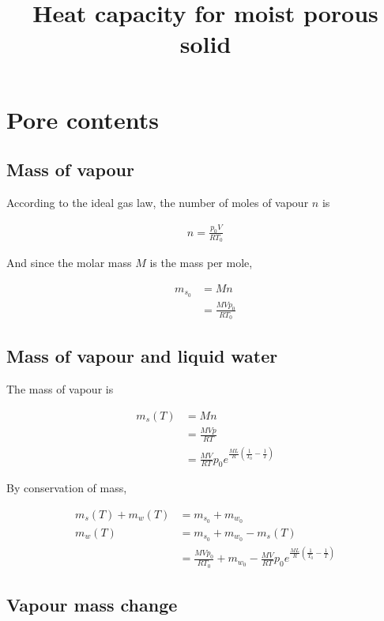 \documentclass{article}
\title{Heat capacity for moist porous solid}
\date{}
\begin{document}
\maketitle

\section{Pore contents}

\subsection{Mass of vapour}

According to the ideal gas law, the number of moles of vapour $n$ is

\begin{align*}
n = \frac{p_0 V}{RT_0}
\end{align*}

And since the molar mass $M$ is the mass per mole,

\begin{align*}
m_{s_0} &= Mn \\
&= \frac{MVp_0}{RT_0}
\end{align*}

\subsection{Mass of vapour and liquid water}

The mass of vapour is

\begin{align*}
m_s(T) &= Mn \\
&= \frac{MVp}{RT} \\
&= \frac{MV}{RT}p_0 e^{\frac{ML}{R}\left(\frac{1}{T_0} - \frac{1}{T}\right)}
\end{align*}

By conservation of mass,

\begin{align*}
m_s(T) + m_w(T) &= m_{s_0} + m_{w_0} \\
m_w(T) &= m_{s_0} + m_{w_0} - m_s(T) \\
&= \frac{MVp_0}{RT_0} + m_{w_0} - \frac{MV}{RT}p_0 e^{\frac{ML}{R}\left(\frac{1}{T_0} - \frac{1}{T}\right)}
\end{align*}

\subsection{Vapour mass change}
\end{document}
